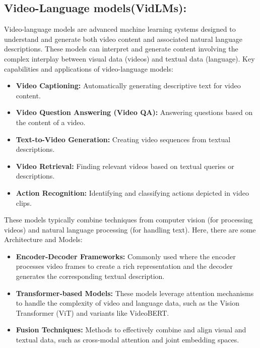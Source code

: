 \subsection{Video-Language models(VidLMs):}
\noindent Video-language models are advanced machine learning systems designed to understand and generate both video content and associated natural language descriptions. These models can interpret and generate content involving the complex interplay between visual data (videos) and textual data (language). Key capabilities and applications of video-language models:

\begin{itemize}
\item \textbf{Video Captioning:} Automatically generating descriptive text for video content.
\item \textbf{Video Question Answering (Video QA):} Answering questions based on the content of a video.
\item \textbf{Text-to-Video Generation:} Creating video sequences from textual descriptions.
\item \textbf{Video Retrieval:} Finding relevant videos based on textual queries or descriptions.
\item \textbf{Action Recognition:} Identifying and classifying actions depicted in video clips.
\end{itemize}

\noindent These models typically combine techniques from computer vision (for processing videos) and natural language processing (for handling text). Here, there are some Architecture and Models:

\begin{itemize}
\item \textbf{Encoder-Decoder Frameworks:} Commonly used where the encoder processes video frames to create a rich representation and the decoder generates the corresponding textual description.
\item \textbf{Transformer-based Models:} These models leverage attention mechanisms to handle the complexity of video and language data, such as the Vision Transformer (ViT) and variants like VideoBERT.
\item \textbf{Fusion Techniques:} Methods to effectively combine and align visual and textual data, such as cross-modal attention and joint embedding spaces.
\end{itemize}